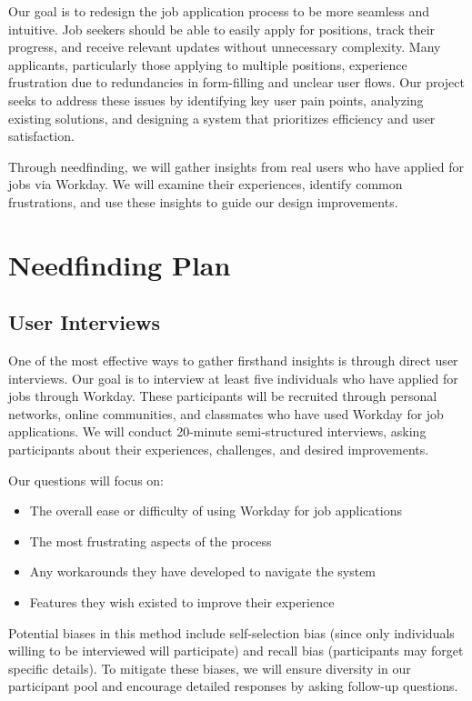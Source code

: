 \documentclass[
	letterpaper, %
]{jdf}
\begin{document}
Our goal is to redesign the job application process to be more seamless and intuitive. Job seekers should be able to easily apply for positions, track their progress, and receive relevant updates without unnecessary complexity. Many applicants, particularly those applying to multiple positions, experience frustration due to redundancies in form-filling and unclear user flows. Our project seeks to address these issues by identifying key user pain points, analyzing existing solutions, and designing a system that prioritizes efficiency and user satisfaction.

Through needfinding, we will gather insights from real users who have applied for jobs via Workday. We will examine their experiences, identify common frustrations, and use these insights to guide our design improvements. 

\newpage

\section{Needfinding Plan}
\subsection {User Interviews}
One of the most effective ways to gather firsthand insights is through direct user interviews. Our goal is to interview at least five individuals who have applied for jobs through Workday. These participants will be recruited through personal networks, online communities, and classmates who have used Workday for job applications. We will conduct 20-minute semi-structured interviews, asking participants about their experiences, challenges, and desired improvements.

Our questions will focus on:
\begin{itemize}
    \item The overall ease or difficulty of using Workday for job applications
    \item The most frustrating aspects of the process
    \item Any workarounds they have developed to navigate the system
    \item Features they wish existed to improve their experience
\end{itemize}

Potential biases in this method include self-selection bias (since only individuals willing to be interviewed will participate) and recall bias (participants may forget specific details). To mitigate these biases, we will ensure diversity in our participant pool and encourage detailed responses by asking follow-up questions.
\hfill \break
\end{document}
